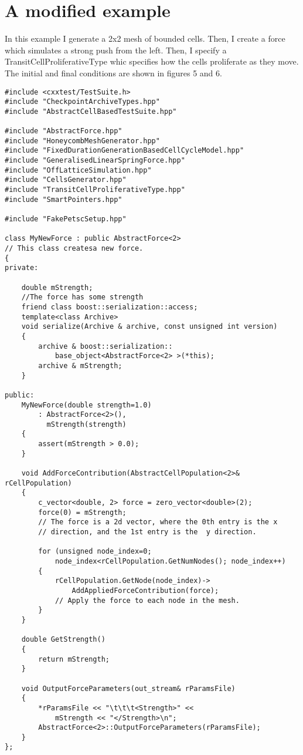 \section{A modified example} 
In this example I generate a 2x2 mesh of bounded cells. Then, I create a force which  simulates a strong push from the left. Then, I specify a TransitCellProliferativeType whic specifies how the cells proliferate as they move. The initial and final conditions  are shown in figures 5 and 6.

\begin{lstlisting}
#include <cxxtest/TestSuite.h>
#include "CheckpointArchiveTypes.hpp"
#include "AbstractCellBasedTestSuite.hpp"

#include "AbstractForce.hpp"
#include "HoneycombMeshGenerator.hpp"
#include "FixedDurationGenerationBasedCellCycleModel.hpp"
#include "GeneralisedLinearSpringForce.hpp"
#include "OffLatticeSimulation.hpp"
#include "CellsGenerator.hpp"
#include "TransitCellProliferativeType.hpp"
#include "SmartPointers.hpp"

#include "FakePetscSetup.hpp"

class MyNewForce : public AbstractForce<2>
// This class createsa new force.
{
private:

    double mStrength;
    //The force has some strength
    friend class boost::serialization::access;
    template<class Archive>
    void serialize(Archive & archive, const unsigned int version)
    {
        archive & boost::serialization::
			base_object<AbstractForce<2> >(*this);
        archive & mStrength;
    }

public:
    MyNewForce(double strength=1.0)
        : AbstractForce<2>(),
          mStrength(strength)
    {
        assert(mStrength > 0.0);
    }

    void AddForceContribution(AbstractCellPopulation<2>& rCellPopulation)
    {
        c_vector<double, 2> force = zero_vector<double>(2);
        force(0) = mStrength;
        // The force is a 2d vector, where the 0th entry is the x
        // direction, and the 1st entry is the  y direction.

        for (unsigned node_index=0; 
			node_index<rCellPopulation.GetNumNodes(); node_index++)
        {
            rCellPopulation.GetNode(node_index)->
				AddAppliedForceContribution(force);
			// Apply the force to each node in the mesh.
        }
    }

    double GetStrength()
    {
        return mStrength;
    }

    void OutputForceParameters(out_stream& rParamsFile)
    {
        *rParamsFile << "\t\t\t<Strength>" << 
			mStrength << "</Strength>\n";
        AbstractForce<2>::OutputForceParameters(rParamsFile);
    }
};


\end{lstlisting}
